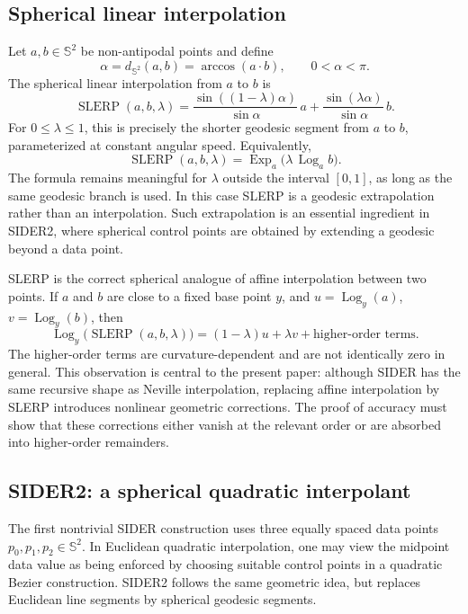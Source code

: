 \documentclass[a4paper,11pt]{article}
\newcommand{\bS}{\mathbb{S}}
\newcommand{\Log}{\operatorname{Log}}
\newcommand{\Exp}{\operatorname{Exp}}
\newcommand{\SLERP}{\operatorname{SLERP}}
\numberwithin{equation}{section}
\begin{document}
\subsection{Spherical linear interpolation}

Let \(a,b\in\bS^2\) be non-antipodal points and define
\[
        \alpha=d_{\bS^2}(a,b)=\arccos(a\cdot b),\qquad 0<\alpha<\pi .
\]
The spherical linear interpolation from \(a\) to \(b\) is
\begin{equation}
\label{eq:slerp}
\SLERP(a,b,\lambda)
=
\frac{\sin((1-\lambda)\alpha)}{\sin\alpha}\,a
+
\frac{\sin(\lambda\alpha)}{\sin\alpha}\,b .
\end{equation}
For \(0\leq\lambda\leq1\), this is precisely the shorter geodesic segment
from \(a\) to \(b\), parameterized at constant angular speed.  Equivalently,
\[
        \SLERP(a,b,\lambda)
        =
        \Exp_a\!\bigl(\lambda\,\Log_a b\bigr).
\]
The formula remains meaningful for \(\lambda\) outside the interval
\([0,1]\), as long as the same geodesic branch is used.  In this case SLERP is
a geodesic extrapolation rather than an interpolation.  Such extrapolation is
an essential ingredient in SIDER2, where spherical control points are obtained
by extending a geodesic beyond a data point.

SLERP is the correct spherical analogue of affine interpolation between two
points.  If \(a\) and \(b\) are close to a fixed base point \(y\), and
\(u=\Log_y(a)\), \(v=\Log_y(b)\), then
\[
        \Log_y\bigl(\SLERP(a,b,\lambda)\bigr)
        =
        (1-\lambda)u+\lambda v+\text{higher-order terms}.
\]
The higher-order terms are curvature-dependent and are not identically zero in
general.  This observation is central to the present paper: although SIDER has
the same recursive shape as Neville interpolation, replacing affine
interpolation by SLERP introduces nonlinear geometric corrections.  The proof
of accuracy must show that these corrections either vanish at the relevant
order or are absorbed into higher-order remainders.

\subsection{SIDER2: a spherical quadratic interpolant}

The first nontrivial SIDER construction uses three equally spaced data points
\(p_0,p_1,p_2\in\bS^2\).  In Euclidean quadratic interpolation, one may view
the midpoint data value as being enforced by choosing suitable control points
in a quadratic Bezier construction.  SIDER2 follows the same geometric idea,
but replaces Euclidean line segments by spherical geodesic segments.
\end{document}
